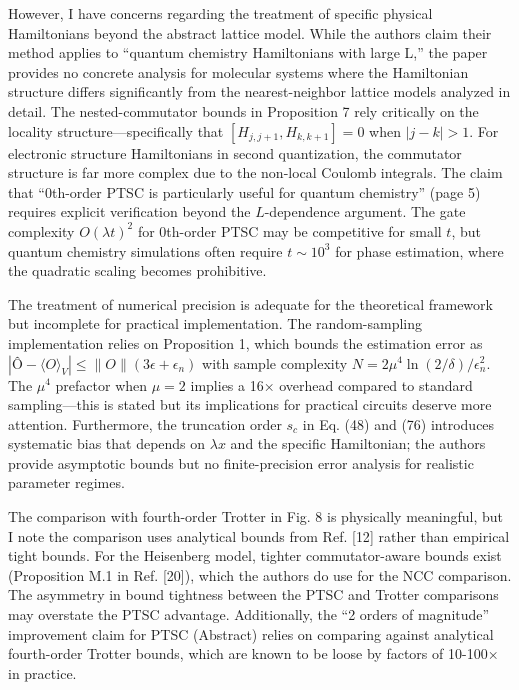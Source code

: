 \documentclass[10pt,letterpaper]{article}
\begin{document}
However, I have concerns regarding the treatment of specific physical Hamiltonians beyond the abstract lattice model. While the authors claim their method applies to ``quantum chemistry Hamiltonians with large L,'' the paper provides no concrete analysis for molecular systems where the Hamiltonian structure differs significantly from the nearest-neighbor lattice models analyzed in detail. The nested-commutator bounds in Proposition 7 rely critically on the locality structure---specifically that \([H_{j,j+1}, H_{k,k+1}] = 0\) when \(|j-k| > 1\). For electronic structure Hamiltonians in second quantization, the commutator structure is far more complex due to the non-local Coulomb integrals. The claim that ``0th-order PTSC is particularly useful for quantum chemistry'' (page 5) requires explicit verification beyond the \(L\)-dependence argument. The gate complexity \(O(\lambda t)^2\) for 0th-order PTSC may be competitive for small \(t\), but quantum chemistry simulations often require \(t \sim 10^3\) for phase estimation, where the quadratic scaling becomes prohibitive.

The treatment of numerical precision is adequate for the theoretical framework but incomplete for practical implementation. The random-sampling implementation relies on Proposition 1, which bounds the estimation error as \(|Ô - \langle O \rangle_V| \leq \|O\|(3\epsilon + \epsilon_n)\) with sample complexity \(N = 2\mu^4 \ln(2/\delta)/\epsilon_n^2\). The \(\mu^4\) prefactor when \(\mu = 2\) implies a 16× overhead compared to standard sampling---this is stated but its implications for practical circuits deserve more attention. Furthermore, the truncation order \(s_c\) in Eq. (48) and (76) introduces systematic bias that depends on \(\lambda x\) and the specific Hamiltonian; the authors provide asymptotic bounds but no finite-precision error analysis for realistic parameter regimes.

The comparison with fourth-order Trotter in Fig. 8 is physically meaningful, but I note the comparison uses analytical bounds from Ref. {[}12{]} rather than empirical tight bounds. For the Heisenberg model, tighter commutator-aware bounds exist (Proposition M.1 in Ref. {[}20{]}), which the authors do use for the NCC comparison. The asymmetry in bound tightness between the PTSC and Trotter comparisons may overstate the PTSC advantage. Additionally, the ``2 orders of magnitude'' improvement claim for PTSC (Abstract) relies on comparing against analytical fourth-order Trotter bounds, which are known to be loose by factors of 10-100× in practice.
\end{document}
